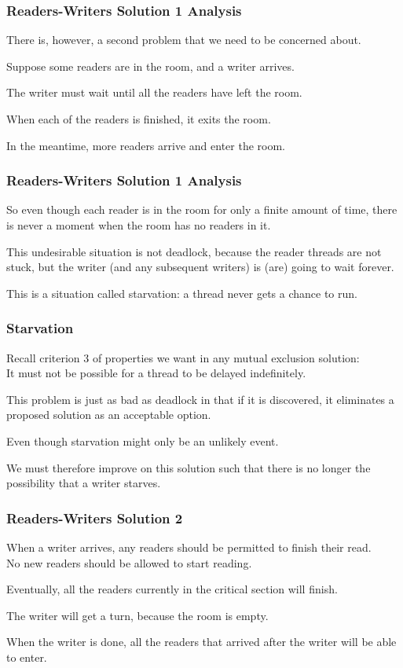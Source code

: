 \begin{frame}
\frametitle{Readers-Writers Solution 1 Analysis}

There is, however, a second problem that we need to be concerned about. 

Suppose some readers are in the room, and a writer arrives. 

The writer must wait until all the readers have left the room. 

When each of the readers is finished, it exits the room. 

In the meantime, more readers arrive and enter the room.
\end{frame}


\begin{frame}
\frametitle{Readers-Writers Solution 1 Analysis}

So even though each reader is in the room for only a finite amount of time, there is never a moment when the room has no readers in it. 

This undesirable situation is not deadlock, because the reader threads are not stuck, but the writer (and any subsequent writers) is (are) going to wait forever.

This is a situation called \alert{starvation}: a thread never gets a chance to run.


\end{frame}


\begin{frame}
\frametitle{Starvation}

Recall criterion 3 of properties we want in any mutual exclusion solution:\\
\quad It must not be possible for a thread to be delayed indefinitely. 

This problem is just as bad as deadlock in that if it is discovered, it eliminates a proposed solution as an acceptable option.

Even though starvation might only be an unlikely event. 

We must therefore improve on this solution such that there is no longer the possibility that a writer starves.


\end{frame}


\begin{frame}
\frametitle{Readers-Writers Solution 2}

When a writer arrives, any readers should be permitted to finish their read.\\
\quad No new readers should be allowed to start reading. 

Eventually, all the readers currently in the critical section will finish. 

The writer will get a turn, because the room is empty.

When the writer is done, all the readers that arrived after the writer will be able to enter.

\end{frame}

